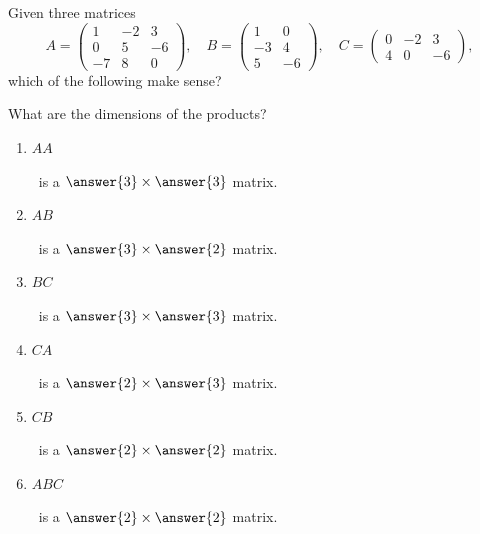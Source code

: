 \documentclass{ximera}
\begin{document}
\begin{question}
  Given three matrices
  \[
    A =\begin{pmatrix}
      1 & -2 & 3 \\
      0 & 5 & -6 \\
      -7 & 8 & 0
    \end{pmatrix},\quad B =\begin{pmatrix}
      1 & 0 \\
      -3 & 4 \\
      5 & -6
    \end{pmatrix}, \quad C =\begin{pmatrix}
      0 & -2 & 3 \\
      4 & 0 & -6
    \end{pmatrix},
  \]
  which of the following make sense?
  \begin{selectAll}
      \pdfOnly{\end{multicols}}
  \end{selectAll}
  \begin{question}
    What are the dimensions of the products?
      \begin{enumerate}
      \item $AA$\begin{prompt}~is a $\answer{3}\times\answer{3}$ matrix.\end{prompt}
      \item $AB$\begin{prompt}~is a $\answer{3}\times\answer{2}$ matrix.\end{prompt}
      \item $BC$\begin{prompt}~is a $\answer{3}\times\answer{3}$ matrix.\end{prompt}
      \item $CA$\begin{prompt}~is a $\answer{2}\times\answer{3}$ matrix.\end{prompt}
      \item $CB$\begin{prompt}~is a $\answer{2}\times\answer{2}$ matrix.\end{prompt}
      \item $ABC$\begin{prompt}~is a $\answer{2}\times\answer{2}$ matrix.\end{prompt}
      \end{enumerate}
      \pdfOnly{\end{multicols}}
  \end{question}
\end{question}
\end{document}
